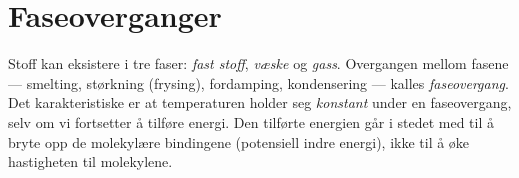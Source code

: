 
\section{Faseoverganger}

Stoff kan eksistere i tre faser: \emph{fast stoff}, \emph{væske} og \emph{gass}. Overgangen mellom fasene — smelting, størkning (frysing), fordamping, kondensering — kalles \emph{faseovergang}. Det karakteristiske er at temperaturen holder seg \emph{konstant} under en faseovergang, selv om vi fortsetter å tilføre energi. Den tilførte energien går i stedet med til å bryte opp de molekylære bindingene (potensiell indre energi), ikke til å øke hastigheten til molekylene.

